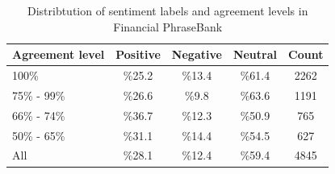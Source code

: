 \documentclass[../main.tex]{subfiles}
\begin{document}
\begin{table}
  \caption{Distribtution of sentiment labels and agreement levels in Financial PhraseBank}
  \label{tab:phrasebank}
  \begin{tabular}{lcccc}
    \toprule
    Agreement level  &  Positive &  Negative &  Neutral & Count\\
    \midrule
    100\% &         \%25.2 & \%13.4 & \%61.4 & 2262 \\
    75\% - 99\% &   \%26.6 & \%9.8 & \%63.6 & 1191 \\
    66\% - 74\% &   \%36.7 & \%12.3 & \%50.9 & 765 \\
    50\% - 65\% &   \%31.1 & \%14.4 & \%54.5 & 627 \\
    \midrule
    All &           \%28.1 & \%12.4 & \%59.4 & 4845 \\
  \bottomrule
\end{tabular}
\end{table}
\end{document}
